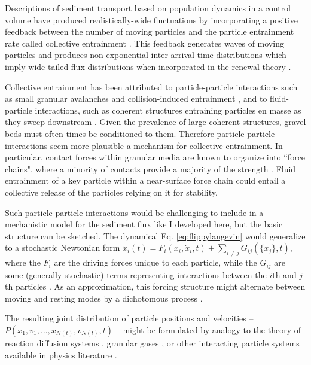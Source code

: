 Descriptions of sediment transport based on population dynamics in a control volume have produced realistically-wide fluctuations by incorporating a positive feedback between the number of moving particles and the particle entrainment rate called collective entrainment \citep{Ancey2008,Ancey2014}.
This feedback generates waves of moving particles \citep{Ancey2014, Heyman2014} and produces non-exponential inter-arrival time distributions \citep{Heyman2013} which imply wide-tailed flux distributions when incorporated in the renewal theory \citep[e.g.][]{Turowski2010,Ancey2020}.

Collective entrainment has been attributed to particle-particle interactions such as small granular avalanches and collision-induced entrainment \citep[e.g.][]{Lee2018, Pahtz2020}, and to fluid-particle interactions, such as coherent structures entraining particles en masse as they sweep downstream \citep{Ancey2014,Cameron2020}. Given the prevalence of large coherent structures, gravel beds must often times be conditioned to them. Therefore particle-particle interactions seem more plausible a mechanism for collective entrainment. In particular, contact forces within granular media are known to organize into ``force chains", where a minority of contacts provide a majority of the strength \citep[e.g.][]{Radjai1996, Azema2012}. Fluid entrainment of a key particle within a near-surface force chain could entail a collective release of the particles relying on it for stability.

Such particle-particle interactions would be challenging to include in a mechanistic model for the sediment flux like I developed here, but the basic structure can be sketched.
The dynamical Eq. \ref{eq:flippylangevin} would generalize to a stochastic Newtonian form $\ddot{x}_i(t) = F_i(x_i,\dot{x}_i, t) + \sum_{i\neq j}G_{ij}(\{x_j\},t)$, where the $F_i$ are the driving forces unique to each particle, while the $G_{ij}$ are some (generally stochastic) terms representing interactions between the $i$th and $j$th particles \citep{Goldstein1997}. As an approximation, this forcing structure might alternate between moving and resting modes by a dichotomous process \citep[e.g.][]{Bena2006}.

The resulting joint distribution of particle positions and velocities -- $P(x_1,v_1,\dots,x_{N(t)},v_{N(t)},t)$ -- might be formulated by analogy to the theory of reaction diffusion systems \citep{Pechenik1999, Cardy2008}, granular gases \citep{Brilliantov2004}, or other interacting particle systems available in physics literature \citep{Hernandez2004,Escaff2018}.

